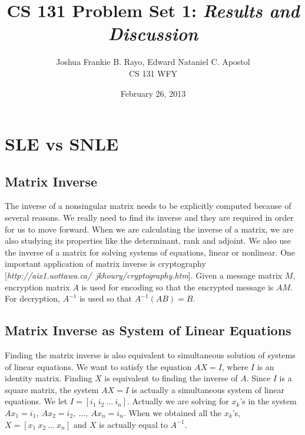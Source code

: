 \documentclass[a4paper]{article}
\begin{document}
	\title{CS 131 Problem Set 1: \textit{Results and Discussion}}
	\date{February 26, 2013}
	\author{Joshua Frankie B. Rayo, Edward Nataniel C. Apostol\\ CS 131 WFY}
	\maketitle{}

	\section{SLE vs SNLE}
		\subsection{Matrix Inverse}
			The inverse of a nonsingular matrix needs to be explicitly computed because of several reasons.
			We really need to find its inverse and they are required in order for us to move forward.
			When we are calculating the inverse of a matrix, we are also studying its properties like the determinant, rank and adjoint.
			We also use the inverse of a matrix for solving systems of equations, linear or nonlinear.
			One important application of matrix inverse is cryptography [\textit{http://aix1.uottawa.ca/~jkhoury/cryptography.htm}].
			Given a message matrix $M$, encryption matrix $A$ is used for encoding so that the encrypted message is $AM$.
			For decryption, $A^{-1}$ is used so that $A^{-1}(AB)=B$.
			
		\subsection{Matrix Inverse as System of Linear Equations}
			Finding the matrix inverse is also equivalent to simultaneous solution of systems of linear equations.
			We want to satisfy the equation $AX=I$, where $I$ is an identity matrix.
			Finding $X$ is equivalent to finding the inverse of $A$.
			Since $I$ is a square matrix, the system $AX=I$ is actually a simultaneous system of linear equations.
			We let $I = [i_{1}\: i_{2}\: ...\: i_{n}]$.
			Actually we are solving for $x_{k}$'s in the system $Ax_{1}=i_{1},\: Ax_{2}=i_{2},\: ... ,\: Ax_{n}=i_{n}$.
			When we obtained all the $x_{k}$'s, $X = [x_{1}\: x_{2}\: ...\: x_{n}]$ and $X$ is actually equal to $A^{-1}$.
			
\end{document}
